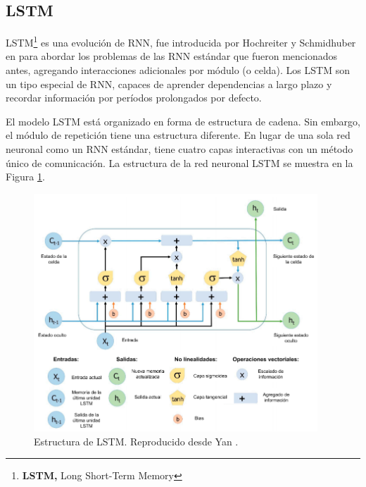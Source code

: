 \subsection{LSTM}

LSTM\footnote{\textbf{LSTM,} Long Short-Term Memory} es una evoluci\'{o}n de RNN, fue introducida por Hochreiter y Schmidhuber en \citeyear{Reference52} para abordar los problemas de las RNN est\'{a}ndar que fueron mencionados antes, agregando interacciones adicionales por m\'{o}dulo (o celda). Los LSTM son un tipo especial de RNN, capaces de aprender dependencias a largo plazo y recordar información por períodos prolongados por defecto.

\vspace{5mm} %

El modelo LSTM está organizado en forma de estructura de cadena. Sin embargo, el módulo de repetición tiene una estructura diferente. En lugar de una sola red neuronal como un RNN estándar, tiene cuatro capas interactivas con un método único de comunicación. La estructura de la red neuronal LSTM se muestra en la Figura \ref{fig:lstm}.

\begin{figure}[h!]
  \begin{center}	\includegraphics[width=0.95\textwidth, frame]{imagenes/Cap4/lstm}
  \caption{Estructura de LSTM. Reproducido desde Yan \protect\cite{Reference54}.} 
  \label{fig:lstm}
  \end{center}
\end{figure}


